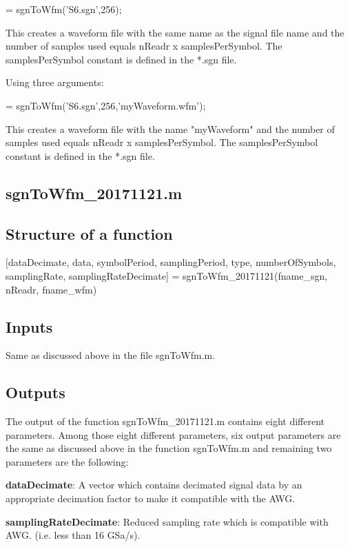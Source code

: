 \bigskip

 = sgnToWfm('S6.sgn',256);
\bigskip

\noindent
This creates a waveform file with the same name as the signal file name and the number of samples used equals nReadr x samplesPerSymbol. The samplesPerSymbol constant is 	defined in the *.sgn file.
\bigskip

\noindent
Using three arguments:

\bigskip

 = sgnToWfm('S6.sgn',256,'myWaveform.wfm');
\bigskip

\noindent
This creates a waveform file with the name "myWaveform" and the number of samples used equals nReadr x samplesPerSymbol. The samplesPerSymbol constant is defined in the *.sgn file.

\subsection{sgnToWfm\_20171121.m}

\subsection*{Structure of a function}
[dataDecimate, data, symbolPeriod, samplingPeriod, type, numberOfSymbols, samplingRate, samplingRateDecimate]  = sgnToWfm\_20171121(fname\_sgn, nReadr, fname\_wfm)

\subsection*{Inputs}
Same as discussed above in the file sgnToWfm.m.


\subsection*{Outputs}
The output of the function sgnToWfm\_20171121.m contains eight different parameters. Among those eight different parameters, six output parameters are the same as discussed above in the function sgnToWfm.m and remaining two parameters are the following:
\bigskip

\textbf{dataDecimate}: A vector which contains decimated signal data by an appropriate decimation factor to make it compatible with the AWG.
\bigskip	

\textbf{samplingRateDecimate}: Reduced sampling rate which is compatible with AWG. (i.e. less than 16 GSa/s).


